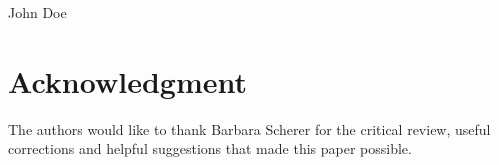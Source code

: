 \documentclass[conference]{IEEEtran}
\begin{document}
%
%
%





% 

\begin{IEEEbiography}{John Doe}
\blindtext
\end{IEEEbiography}




\section*{Acknowledgment}		
	
The authors would like to thank Barbara Scherer for the critical review, useful corrections
and helpful suggestions that made this paper possible.


\end{document}
